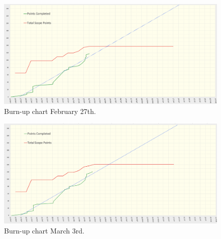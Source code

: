     \begin{figure}[H]
      \centering
      \includegraphics[width=12cm]{assets/outputs/burnups/02-27.png}
      \caption{Burn-up chart February 27th.}
      \label{fig:burnup5}
    \end{figure}
  
    \begin{figure}[H]
      \centering
      \includegraphics[width=12cm]{assets/outputs/burnups/03-03.png}
      \caption{Burn-up chart March 3rd.}
      \label{fig:burnup6}
    \end{figure}
  
  \newpage
